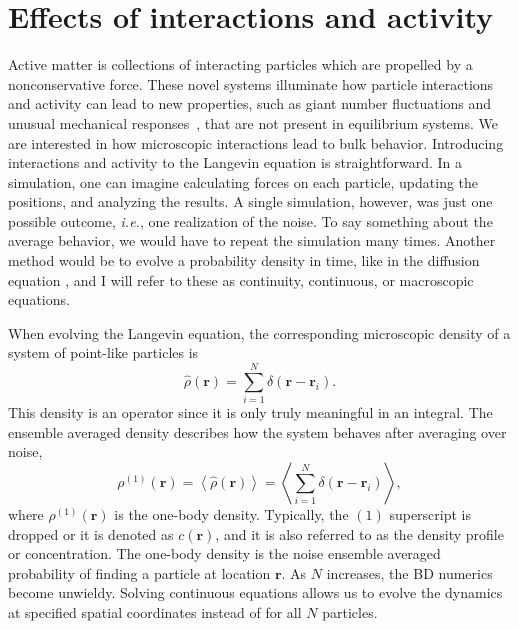 \section{Effects of interactions and activity}

Active matter is collections of interacting particles which are propelled by a
nonconservative force.  These novel systems illuminate how particle interactions
and activity can lead to new properties, such as giant number fluctuations and
unusual mechanical responses~\cite{marchetti_hydrodynamics_13}, that are not
present in equilibrium systems.  We are interested in how microscopic
interactions lead to bulk behavior.  Introducing interactions and activity to
the Langevin equation is straightforward.  In a simulation,  one can imagine
calculating forces on each particle, updating the positions, and analyzing the
results.  A single simulation, however, was just one possible
outcome, \textit{i.e.}, one realization of the noise.  To say something about
the average behavior, we would have to repeat the simulation many times.
Another method would be to evolve a probability density in time, like in the
diffusion equation , and I will refer to these as
continuity, continuous, or macroscopic equations.

When evolving the Langevin equation, the corresponding microscopic density of a
system of point-like particles is~\cite{hansen_theory_06}
%
\begin{equation}
  \label{eqn:density_operator}
  \hat{\rho}(\bm{r}) = \sum_{i=1}^N \delta( \bm{r} - \bm{r}_i ).
\end{equation}
%
This density is an operator since it is only truly meaningful in an integral.
The ensemble averaged density describes how the system behaves after averaging
over noise,
%
\begin{equation}
  \rho^{(1)}(\bm{r}) = \left\langle \hat{\rho}(\bm{r}) \right\rangle = 
  \left\langle \sum_{i=1}^N \delta( \bm{r} - \bm{r}_i
  ) \right\rangle,
\end{equation}
%
where $\rho^{(1)}(\bm{r})$ is the one-body density. Typically, the $(1)$
superscript is dropped or it is denoted as $c(\bm{r})$, and it is also referred
to as the density profile or concentration.  The one-body density is the noise
ensemble averaged probability of finding a particle at location $\bm{r}$. As $N$
increases, the BD numerics become unwieldy.  Solving continuous equations allows
us to evolve the dynamics at specified spatial coordinates instead of for all
$N$ particles.   

